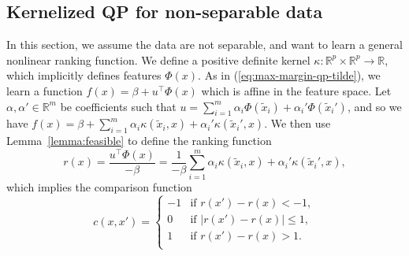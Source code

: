 \documentclass{article}
\newcommand{\RR}{\mathbb R}
\begin{document}
\subsection{Kernelized QP for non-separable data}
\label{sec:kernelized-qp}
In this section, we assume the data are not separable, and want to
learn a general nonlinear ranking function. We define a positive
definite kernel $\kappa:\RR^p\times \RR^p\rightarrow\RR$, which
implicitly defines features $\Phi(x)$. As in
(\ref{eq:max-margin-qp-tilde}), we learn a function $f(x)=\beta +
u^\intercal \Phi(x)$ which is affine in the feature space. Let
$\alpha,\alpha'\in\RR^m$ be coefficients such that $u=\sum_{i=1}^m
\alpha_i \Phi(\tilde x_i) + \alpha_i' \Phi(\tilde x_i')$, and so we
have
 $f(x) =\beta + \sum_{i=1}^m \alpha_i \kappa(\tilde x_i, x) +
\alpha_i' \kappa(\tilde x_i', x)$. We then use Lemma~\ref{lemma:feasible} to
define the ranking function
\begin{equation}
  \label{eq:kernelized_r}
  r(x)= \frac{u^\intercal \Phi(x)}{-\beta} = \frac{1}{-\beta}
  \sum_{i=1}^m
    \alpha_i \kappa(\tilde x_i, x) + \alpha_i'  \kappa(\tilde x_i', x) 
  ,
\end{equation}
which implies the comparison function
\begin{equation}
  \label{eq:kernelized_c}
  c(x, x') =
  \begin{cases}
    -1 & \text{if } r(x') - r(x) < -1, \\
    0 & \text{if } |r(x') - r(x)| \leq 1, \\
    1 & \text{if } r(x') - r(x) > 1. \\
  \end{cases}
\end{equation}
\end{document}
